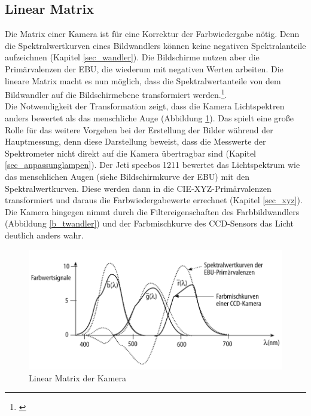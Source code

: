 \subsection{Linear Matrix}
\label{matrix}
Die Matrix einer Kamera ist für eine Korrektur der Farbwiedergabe nötig. Denn die Spektralwertkurven eines Bildwandlers können keine negativen Spektralanteile aufzeichnen (Kapitel \ref{sec_wandler}). Die Bildschirme nutzen aber die Primärvalenzen der EBU, die wiederum mit negativen Werten arbeiten. Die lineare Matrix macht es nun möglich, dass die Spektralwertanteile von dem Bildwandler auf die Bildschirmebene transformiert werden.\footnote{\cite[412-413]{schmidt}}.\\
Die Notwendigkeit der Transformation zeigt, dass die Kamera Lichtspektren anders bewertet als das menschliche Auge (Abbildung \ref{b_matrix}). Das spielt eine große Rolle für das weitere Vorgehen bei der Erstellung der Bilder während der Hauptmessung, denn diese Darstellung beweist, dass die Messwerte der Spektrometer nicht direkt auf die Kamera übertragbar sind (Kapitel \ref{sec_anpassunglampen}). Der Jeti specbos 1211 bewertet das Lichtspektrum wie das menschlichen Augen (siehe Bildschirmkurve der EBU) mit den Spektralwertkurven. Diese werden dann in die CIE-XYZ-Primärvalenzen transformiert und daraus die Farbwiedergabewerte errechnet (Kapitel \ref{sec_xyz}). Die Kamera hingegen nimmt durch die Filtereigenschaften des Farbbildwandlers (Abbildung \ref{b_twandler}) und der Farbmischkurve des CCD-Sensors das Licht deutlich anders wahr.

\begin{figure}[H]     %
\centering
\includegraphics[width=1.0\textwidth]{bilder/matrix} 
\caption {Linear Matrix der Kamera\protect\footnotemark}\label{b_matrix}
\end{figure}



